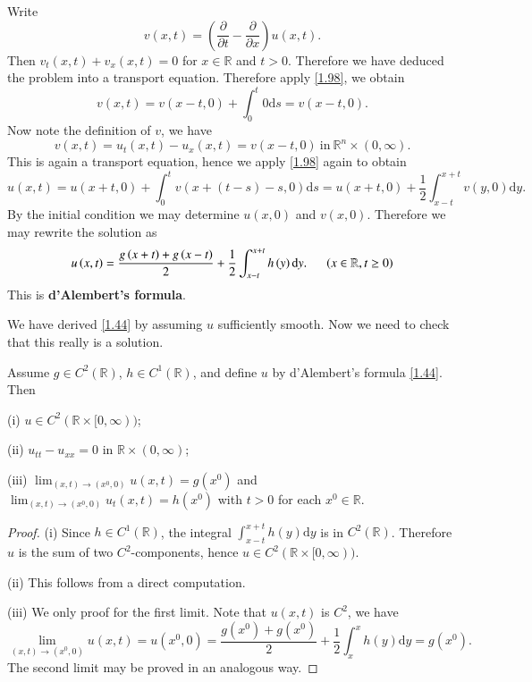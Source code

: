 Write 
$$
v\left( x,t \right) =\left( \frac{\partial}{\partial t}-\frac{\partial}{\partial x} \right) u\left( x,t \right) .
$$
Then $v_t(x,t)+v_x(x,t)=0$ for $x\in\mathbb{R}$ and $t>0$. Therefore we have deduced the problem into a transport equation. Therefore apply \eqref{1.98}, we obtain 
$$
v\left( x,t \right) =v\left( x-t,0 \right) +\int_0^t{0\mathrm{d}s}=v\left( x-t,0 \right) .
$$
Now note the definition of $v$, we have 
$$
v\left( x,t \right) =u_t\left( x,t \right) -u_x\left( x,t \right) =v\left( x-t,0 \right) \ \text{in}\ \mathbb{R}^n\times(0,\infty).
$$
This is again a transport equation, hence we apply \eqref{1.98} again to obtain 
$$
u\left( x,t \right) =u\left( x+t,0 \right) +\int_0^t{v\left( x+\left( t-s \right) -s,0 \right) \mathrm{d}s}=u\left( x+t,0 \right) +\frac{1}{2}\int_{x-t}^{x+t}{v\left( y,0 \right) \mathrm{d}y}.
$$
By the initial condition we may determine $u(x,0)$ and $v(x,0)$. Therefore we may rewrite the solution as 
\begin{equation}\label{1.44}
u\left( x,t \right) =\frac{g\left( x+t \right) +g\left( x-t \right)}{2}+\frac{1}{2}\int_{x-t}^{x+t}{h\left( y \right) \mathrm{d}y}.\hspace{0.5cm}\left( x\in \mathbb{R} ,t\ge 0 \right) 
\end{equation}
This is \textbf{d'Alembert's formula}.\par
We have derived \eqref{1.44} by assuming $u$ sufficiently smooth. Now we need to check that this really is a solution.
\begin{theorem}
Assume $g\in C^2(\mathbb{R})$, $h\in C^1(\mathbb{R})$, and define $u$ by d'Alembert's formula \eqref{1.44}. Then \par
(i) $u\in C^2(\mathbb{R}\times[0,\infty))$;\par
(ii) $u_{tt}-u_{xx}=0$ in $\mathbb{R}\times(0,\infty)$;\par
(iii) $\lim_{(x,t)\to (x^0,0)}u(x,t)=g(x^0)$ and $\lim_{(x,t)\to (x^0,0)}u_t(x,t)=h(x^0)$ with $t>0$ for each $x^0\in\mathbb{R}$.
\end{theorem}
\begin{proof}
(i) Since $h\in C^1(\mathbb{R})$, the integral $\int_{x-t}^{x+t}{h\left( y \right) \mathrm{d}y}$ is in $C^2(\mathbb{R})$. Therefore $u$ is the sum of two $C^2$-components, hence $u\in C^2(\mathbb{R}\times[0,\infty))$.\par
(ii) This follows from a direct computation.\par
(iii) We only proof for the first limit. Note that $u(x,t)$ is $C^2$, we have 
$$
\lim_{(x,t)\rightarrow (x^0,0)} u(x,t)=u(x^0,0)=\frac{g(x^0)+g(x^0)}{2}+\frac{1}{2}\int_x^x{h\left( y \right) \mathrm{d}y}=g(x^0).
$$
The second limit may be proved in an analogous way.
\end{proof}
